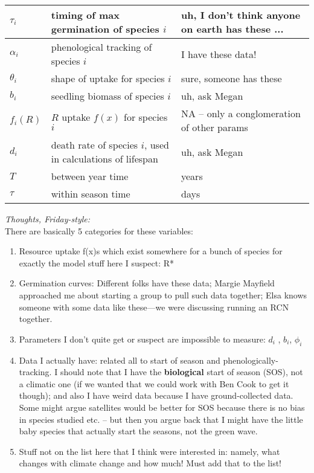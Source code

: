 \documentclass[11pt,a4paper,oneside]{article}
\begin{document}
\begin{center}
\begin{table}[h!]
\begin{tabular}{ | p{3.0cm} | p{6.0cm} | p{4.0cm} |}
\(\tau_{i}\) & timing of max germination of species \(i\) & uh, I don't think anyone on earth has these ...\\ \hline
\(\alpha_{i}\) & phenological tracking of species \(i\) & I have these data! \\ \hline
\(\theta_{i}\) & shape of uptake for species \(i\) & sure, someone has these\\ \hline
\hline
\(b_{i}\) & seedling biomass of species \(i\) & uh, ask Megan \\ \hline
\(f_{i}(R)\) & \(R\) uptake \(f(x)\) for species \(i\) & NA -- only a conglomeration of other params\\ \hline
\(d_{i}\) & death rate of species \(i\), used in calculations of lifespan & uh, ask Megan \\ \hline
\(T\) & between year time & years \\ \hline
\(\tau\) & within season time & days \\ \hline
\hline
\end{tabular}
\end{table}
\end{center}

\newpage
\noindent \emph{Thoughts, Friday-style:}\\

\noindent There are basically 5 categories for these variables:
\begin{enumerate}
\item Resource uptake f(x)s which exist somewhere for a bunch of species for exactly the model stuff here I suspect: R*
\item Germination curves: Different folks have these data; Margie Mayfield approached me about starting a group to pull such data together; Elsa knows someone with some data like these---we were discussing running an RCN together.
\item Parameters I don't quite get or suspect are impossible to measure: \(d_{i}\) , \(b_{i}\), \(\phi_{i}\) 
\item Data I actually have: related all to start of season and phenologically-tracking. I should note that I have the {\bf biological} start of season (SOS), not a climatic one (if we wanted that we could work with Ben Cook to get it though); and also I have weird data because I have ground-collected data. Some might argue satellites would be better for SOS because there is no bias in species studied etc. -- but then you argue back that I might have the little baby species that actually start the seasons, not the green wave.
\item Stuff not on the list here that I think were interested in: namely, what changes with climate change and how much! Must add that to the list!
\end{enumerate}


%
%
\end{document}
